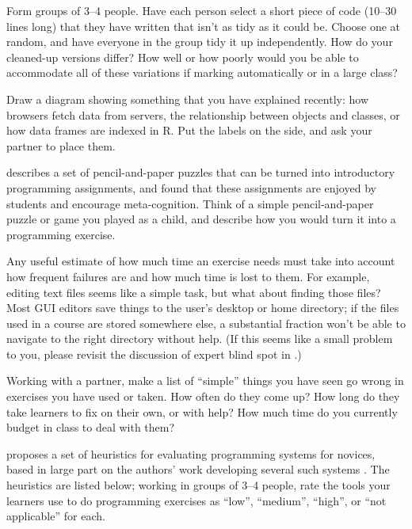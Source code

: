 
Form groups of 3--4 people.  Have each person select a short piece of
code (10--30 lines long) that they have written that isn't as tidy as
it could be.  Choose one at random, and have everyone in the group
tidy it up independently.  How do your cleaned-up versions differ?
How well or how poorly would you be able to accommodate all of these
variations if marking automatically or in a large class?


Draw a diagram showing something that you have explained recently: how
browsers fetch data from servers, the relationship between objects and
classes, or how data frames are indexed in R.  Put the labels on the
side, and ask your partner to place them.


\cite{Butl2017} describes a set of pencil-and-paper puzzles that can
be turned into introductory programming assignments, and found that
these assignments are enjoyed by students and encourage
meta-cognition.  Think of a simple pencil-and-paper puzzle or game you
played as a child, and describe how you would turn it into a
programming exercise.


Any useful estimate of how much time an exercise needs must take into
account how frequent failures are and how much time is lost to them.
For example, editing text files seems like a simple task, but what
about finding those files?  Most GUI editors save things to the user's
desktop or home directory; if the files used in a course are stored
somewhere else, a substantial fraction won't be able to navigate to
the right directory without help. (If this seems like a small problem
to you, please revisit the discussion of expert blind spot in
.)

Working with a partner, make a list of ``simple'' things you have seen
go wrong in exercises you have used or taken.  How often do they come
up?  How long do they take learners to fix on their own, or with help?
How much time do you currently budget in class to deal with them?


\cite{Koll2016} proposes a set of heuristics for evaluating
programming systems for novices, based in large part on the authors'
work developing several such systems \cite{Koll2015}.  The heuristics
are listed below; working in groups of 3--4 people, rate the tools
your learners use to do programming exercises as ``low'', ``medium'',
``high'', or ``not applicable'' for each.

